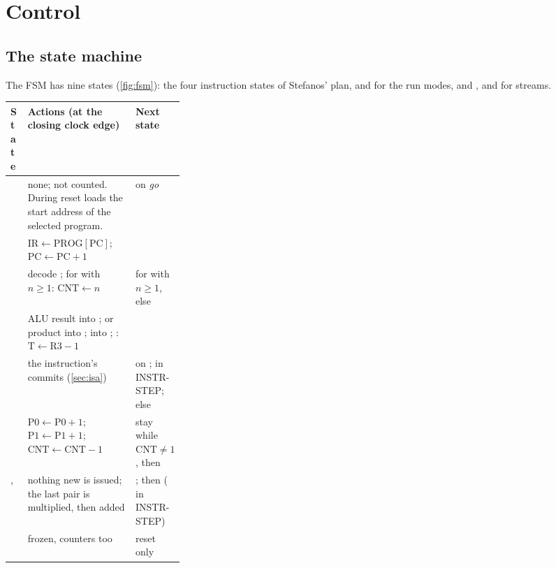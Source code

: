 \section{Control}\label{sec:control}

\subsection{The state machine}


The FSM has nine states (\cref{fig:fsm}): the four instruction states of Stefanos' plan,  and  for the run modes, and ,  and  for streams.

\begin{center}\small
\begin{tabularx}{\linewidth}{@{}l L >{\raggedright\arraybackslash}p{0.29\linewidth}@{}}
\toprule
State & Actions (at the closing clock edge) & Next state \\
\midrule
{} & none; not counted. During reset  loads the start address of the selected program. &  on \emph{go} \\
 & $\mathrm{IR} \gets \mathrm{PROG}[\mathrm{PC}]$; $\mathrm{PC} \gets \mathrm{PC}+1$ &  \\
 & decode ; for  with $n \ge 1$: $\mathrm{CNT} \gets n$ &  for  with $n \ge 1$, else  \\
 & ALU result into ;  or  product into ;  into ; : $\mathrm{T} \gets \mathrm{R3}-1$ &  \\
 & the instruction's commits (\cref{sec:isa}) &  on ;  in INSTR-STEP; else  \\
 & $\mathrm{P0} \gets \mathrm{P0}+1$; $\mathrm{P1} \gets \mathrm{P1}+1$; $\mathrm{CNT} \gets \mathrm{CNT}-1$ & stay while $\mathrm{CNT} \ne 1$, then  \\
,  & nothing new is issued; the last pair is multiplied, then added & ; then  ( in INSTR-STEP) \\
 & frozen, counters too & reset only \\
\bottomrule
\end{tabularx}
\end{center}

